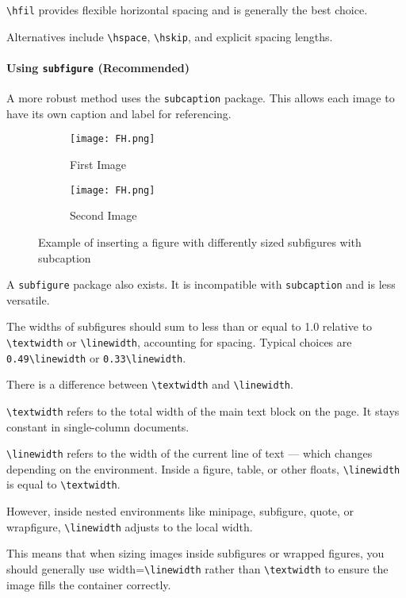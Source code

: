     \verb|\hfil| provides flexible horizontal spacing and is generally the best choice.

    Alternatives include \verb|\hspace|, \verb|\hskip|, and explicit spacing lengths.

    \paragraph{Using \texttt{subfigure} (Recommended)}

    A more robust method uses the \texttt{subcaption} package. This allows each image to have its own caption and label for referencing.

    \begin{figure}[H]
        \centering
        \begin{subfigure}{0.4\textwidth}
            \centering
            \texttt{[image: FH.png]}
            \caption{First Image}
            \label{fig:subfig1}
        \end{subfigure}
        \hfil
        \begin{subfigure}{0.55\textwidth}
            \centering
            \texttt{[image: FH.png]}
            \caption{Second Image}
            \label{fig:subfig2}
        \end{subfigure}
        \caption{Example of inserting a figure with differently sized subfigures with subcaption}
        \label{fig:ExampleFigure-4}
    \end{figure}

    \begin{warningbox}
        A \texttt{subfigure} package also exists. It is incompatible with \texttt{subcaption} and is less versatile.
    \end{warningbox}

    The widths of subfigures should sum to less than or equal to 1.0 relative to \verb|\textwidth| or \verb|\linewidth|, accounting for spacing. Typical choices are \verb|0.49\linewidth| or \verb|0.33\linewidth|.

    \begin{notebox}
        There is a difference between \verb|\textwidth| and \verb|\linewidth|.

        \verb|\textwidth| refers to the total width of the main text block on the page. It stays constant in single-column documents.

        \verb|\linewidth| refers to the width of the current line of text — which changes depending on the environment. Inside a figure, table, or other floats, \verb|\linewidth| is equal to \verb|\textwidth|.

        However, inside nested environments like minipage, subfigure, quote, or wrapfigure, \verb|\linewidth| adjusts to the local width.

        This means that when sizing images inside subfigures or wrapped figures, you should generally use width=\verb|\linewidth| rather than \verb|\textwidth| to ensure the image fills the container correctly.
    \end{notebox}

